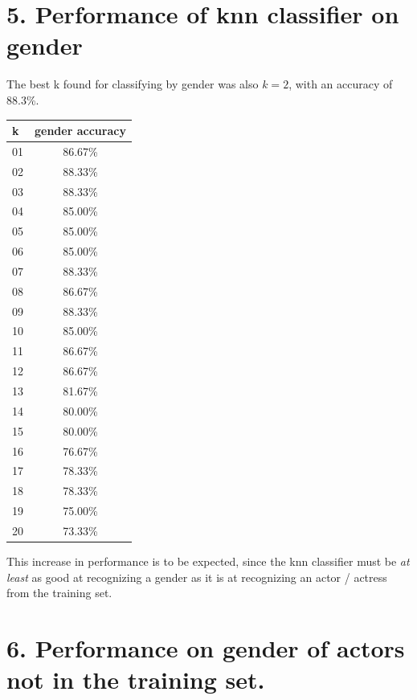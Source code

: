 \documentclass[]{article}
\begin{document}
\clearpage
\newpage

\section{5. Performance of knn classifier on
gender}\label{performance-of-knn-classifier-on-gender}

The best k found for classifying by gender was also \(k=2\), with an
accuracy of \(88.3\)\%.

\begin{center}
\end{center}

\begin{longtable}[c]{@{}lc@{}}
\toprule
k & gender accuracy\tabularnewline
\midrule
\endhead
01 & 86.67\%\tabularnewline
02 & 88.33\%\tabularnewline
03 & 88.33\%\tabularnewline
04 & 85.00\%\tabularnewline
05 & 85.00\%\tabularnewline
06 & 85.00\%\tabularnewline
07 & 88.33\%\tabularnewline
08 & 86.67\%\tabularnewline
09 & 88.33\%\tabularnewline
10 & 85.00\%\tabularnewline
11 & 86.67\%\tabularnewline
12 & 86.67\%\tabularnewline
13 & 81.67\%\tabularnewline
14 & 80.00\%\tabularnewline
15 & 80.00\%\tabularnewline
16 & 76.67\%\tabularnewline
17 & 78.33\%\tabularnewline
18 & 78.33\%\tabularnewline
19 & 75.00\%\tabularnewline
20 & 73.33\%\tabularnewline
\bottomrule
\end{longtable}

This increase in performance is to be expected, since the knn classifier
must be \emph{at least} as good at recognizing a gender as it is at
recognizing an actor / actress from the training set.

\section{6. Performance on gender of actors not in the training
set.}\label{performance-on-gender-of-actors-not-in-the-training-set.}
\end{document}
